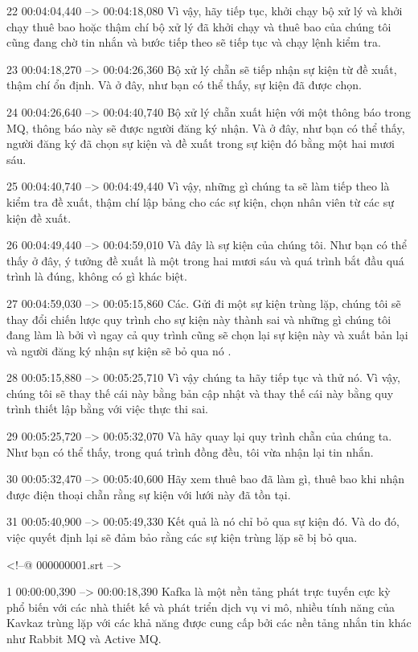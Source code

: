 22
00:04:04,440 --> 00:04:18,080
Vì vậy, hãy tiếp tục, khởi chạy bộ xử lý và khởi chạy thuê bao hoặc thậm chí bộ xử lý đã khởi chạy và thuê bao của chúng tôi cũng đang chờ tin nhắn và bước tiếp theo sẽ tiếp tục và chạy lệnh kiểm tra.

23
00:04:18,270 --> 00:04:26,360
Bộ xử lý chẵn sẽ tiếp nhận sự kiện từ đề xuất, thậm chí ổn định.  Và ở đây, như bạn có thể thấy, sự kiện đã được chọn.

24
00:04:26,640 --> 00:04:40,740
Bộ xử lý chẵn xuất hiện với một thông báo trong MQ, thông báo này sẽ được người đăng ký nhận.  Và ở đây, như bạn có thể thấy, người đăng ký đã chọn sự kiện và đề xuất trong sự kiện đó bằng một hai mươi sáu.

25
00:04:40,740 --> 00:04:49,440
Vì vậy, những gì chúng ta sẽ làm tiếp theo là kiểm tra đề xuất, thậm chí lập bảng cho các sự kiện, chọn nhân viên từ các sự kiện đề xuất.

26
00:04:49,440 --> 00:04:59,010
Và đây là sự kiện của chúng tôi.  Như bạn có thể thấy ở đây, ý tưởng đề xuất là một trong hai mươi sáu và quá trình bắt đầu quá trình là đúng, không có gì khác biệt.

27
00:04:59,030 --> 00:05:15,860
Các.  Gửi đi một sự kiện trùng lặp, chúng tôi sẽ thay đổi chiến lược quy trình cho sự kiện này thành sai và những gì chúng tôi đang làm là bởi vì ngay cả quy trình cũng sẽ chọn lại sự kiện này và xuất bản lại và người đăng ký nhận sự kiện sẽ bỏ qua nó  .

28
00:05:15,880 --> 00:05:25,710
Vì vậy chúng ta hãy tiếp tục và thử nó.  Vì vậy, chúng tôi sẽ thay thế cái này bằng bản cập nhật và thay thế cái này bằng quy trình thiết lập bằng với việc thực thi sai.

29
00:05:25,720 --> 00:05:32,070
Và hãy quay lại quy trình chẵn của chúng ta.  Như bạn có thể thấy, trong quá trình đồng đều, tôi vừa nhận lại tin nhắn.

30
00:05:32,470 --> 00:05:40,600
Hãy xem thuê bao đã làm gì, thuê bao khi nhận được điện thoại chẵn rằng sự kiện với lưới này đã tồn tại.

31
00:05:40,900 --> 00:05:49,330
Kết quả là nó chỉ bỏ qua sự kiện đó.  Và do đó, việc quyết định lại sẽ đảm bảo rằng các sự kiện trùng lặp sẽ bị bỏ qua.

<!--@ 000000001.srt -->

1
00:00:00,390 --> 00:00:18,390
Kafka là một nền tảng phát trực tuyến cực kỳ phổ biến với các nhà thiết kế và phát triển dịch vụ vi mô, nhiều tính năng của Kavkaz trùng lặp với các khả năng được cung cấp bởi các nền tảng nhắn tin khác như Rabbit MQ và Active MQ.

